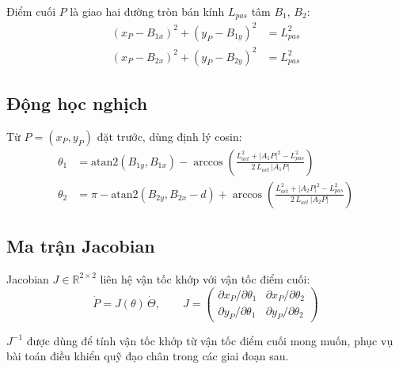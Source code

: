 Điểm cuối $P$ là giao hai đường tròn bán kính $L_{pas}$ tâm $B_1$, $B_2$:
\begin{align}
    (x_P - B_{1x})^2 + (y_P - B_{1y})^2 &= L_{pas}^2 \\
    (x_P - B_{2x})^2 + (y_P - B_{2y})^2 &= L_{pas}^2
\end{align}

\subsection{Động học nghịch}

Từ $P = (x_P, y_P)$ đặt trước, dùng định lý cosin:
\begin{align}
    \theta_1 &= \mathrm{atan2}(B_{1y}, B_{1x})
    - \arccos\!\left(\frac{L_{act}^2 + |A_1P|^2 - L_{pas}^2}
    {2\,L_{act}\,|A_1P|}\right) \\[4pt]
    \theta_2 &= \pi - \mathrm{atan2}(B_{2y}, B_{2x} - d)
    + \arccos\!\left(\frac{L_{act}^2 + |A_2P|^2 - L_{pas}^2}
    {2\,L_{act}\,|A_2P|}\right)
\end{align}

\subsection{Ma trận Jacobian}

Jacobian $J \in \mathbb{R}^{2\times2}$ liên hệ vận tốc khớp với vận tốc
điểm cuối:
\begin{equation}
    \dot{P} = J(\theta)\,\dot{\Theta}, \qquad
    J = \begin{pmatrix}
        \partial x_P/\partial\theta_1 & \partial x_P/\partial\theta_2 \\
        \partial y_P/\partial\theta_1 & \partial y_P/\partial\theta_2
    \end{pmatrix}
    \label{eq:jacobian}
\end{equation}

$J^{-1}$ được dùng để tính vận tốc khớp từ vận tốc điểm cuối mong muốn,
phục vụ bài toán điều khiển quỹ đạo chân trong các giai đoạn sau.

